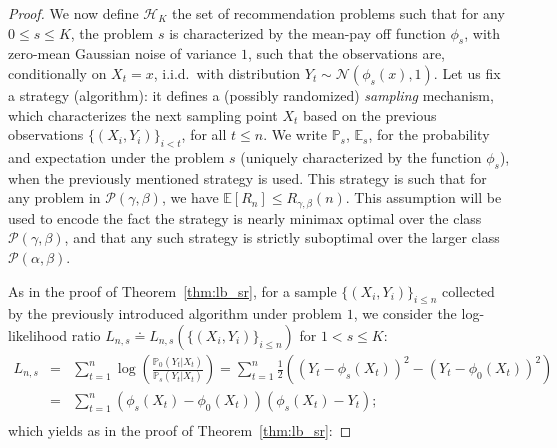\documentclass[final,12pt]{colt2018}
\begin{document}
\begin{proof}
We now define $\mathcal{H}_K$ the set of recommendation problems such that for any $0 \leq s \leq K$, the problem $s$ is characterized by the mean-pay off function $\phi_s$, with zero-mean Gaussian noise of variance $1$, such that the observations are, conditionally on $X_t=x$,  i.i.d.~with distribution $Y_t \sim \mathcal{N}(\phi_s(x), 1)$. Let us fix a strategy (algorithm): it defines a (possibly randomized) \emph{sampling} mechanism, which characterizes the next sampling point $X_t$ based on the previous observations $\{(X_i,Y_i)\}_{i<t}$, for all $t \leq n$. We write $\mathbb P_s$, $\mathbb E_s$, for the probability and expectation under the problem $s$ (uniquely characterized by the function $\phi_s$), when the previously mentioned strategy is used. This strategy is such that for any problem in $\mathcal P(\gamma,\beta)$, we have $\mathbb E[R_n] \leq R_{\gamma,\beta}(n)$. This assumption will be used to encode the fact the strategy is nearly minimax optimal over the class $\mathcal P(\gamma, \beta)$, and that any such strategy is strictly suboptimal over the larger class $\mathcal P(\alpha, \beta)$.

As in the proof of Theorem~\ref{thm:lb_sr}, for a sample $\{(X_i,Y_i)\}_{i\leq n}$ collected by the previously introduced algorithm under problem $1$, we consider the log-likelihood ratio $L_{n,s} \doteq L_{n,s}(\{(X_i,Y_i)\}_{i\leq n})$ for $1 < s \leq K$:
\begin{eqnarray*}
L_{n,s} & = & \sum_{t=1}^n \log\left(\frac{\mathbb P_0(Y_t | X_t)}{\mathbb P_s(Y_t | X_t)}\right) = \sum_{t=1}^n \frac{1}{2}\left( (Y_t-\phi_s(X_t))^2 - (Y_t-\phi_0(X_t))^2 \right)\\
& = & \sum_{t=1}^n (\phi_s(X_t)-\phi_0(X_t))(\phi_s(X_t) - Y_t);\\
\end{eqnarray*}
which yields as in the proof of Theorem~\ref{thm:lb_sr}:


\end{proof}
\end{document}
